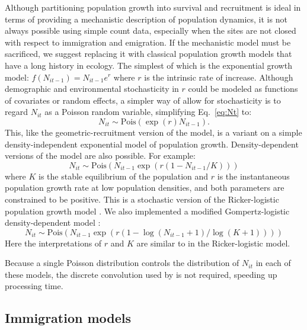 \documentclass[12pt]{article}
\begin{document}
Although partitioning population growth into survival and recruitment
is ideal in terms of providing a mechanistic description of population
dynamics, it is not always possible using simple count data,
especially when the sites are not closed with respect to immigration
and emigration. %
If the mechanistic model must be sacrificed, we suggest replacing it
with classical population growth models that have a long history in
ecology. The simplest of which is the exponential growth
model: $f(N_{it-1}) = N_{it-1}e^r$ where $r$ is the intrinsic
rate of increase. Although demographic and environmental stochasticity
in $r$ could be modeled as functions of covariates or random effects, a
simpler way of allow for stochasticity is to regard $N_{it}$ as a Poisson random variable, simplifying
Eq.~\ref{eq:Nt} to:
\begin{equation}
  N_{it} \sim \text{Pois}(\exp(r)N_{it-1}).
\label{eq:exp}
\end{equation}
This,
like the geometric-recruitment version of the model, is a variant on a simple
density-independent exponential model of population growth.
Density-dependent versions of the model are also possible.  For
example:
\begin{equation}
  N_{it} \sim \text{Pois}(N_{it-1}\exp(r(1-N_{it-1}/K)))
\label{eq:rick}
\end{equation}
where $K$ is the stable equilibrium of the population and $r$ is
the
instantaneous population growth rate at low population
densities, and
both parameters are constrained to be positive. This is a
stochastic version
of the Ricker-logistic population growth model
\citep{ricker:1954}. We also
implemented a modified Gompertz-logistic density-dependent
model \citep{hart_gotelli:2011}:
\begin{equation}
N_{it} \sim
\text{Pois}(N_{it-1}\exp(r(1-\log(N_{it-1}+1)/\log(K+1))))
\label{eq:gomp}
\end{equation}
Here the interpretations of $r$ and $K$ are similar to in the
Ricker-logistic model.

Because a single Poisson distribution controls the
distribution of $N_{it}$ in each of these models, the discrete
convolution used by \citet{dail_madsen:2011} is not required,
speeding up processing time.



\subsection{Immigration models}
\end{document}
